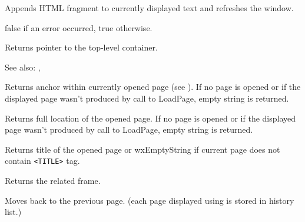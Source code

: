 Appends HTML fragment to currently displayed text and refreshes the window. 




false if an error occurred, true otherwise.

\label{wxhtmlwindowgetinternalrepresentation}


Returns pointer to the top-level container.

See also: , 

\label{wxhtmlwindowgetopenedanchor}


Returns anchor within currently opened page
(see ). 
If no page is opened or if the displayed page wasn't
produced by call to LoadPage, empty string is returned.


\label{wxhtmlwindowgetopenedpage}


Returns full location of the opened page. If no page is opened or if the displayed page wasn't
produced by call to LoadPage, empty string is returned.

\label{wxhtmlwindowgetopenedpagetitle}


Returns title of the opened page or wxEmptyString if current page does not contain {\tt <TITLE>} tag.

\label{wxhtmlwindowgetrelatedframe}


Returns the related frame.

\label{wxhtmlwindowhistoryback}


Moves back to the previous page. (each page displayed using 
 is stored in history list.)

